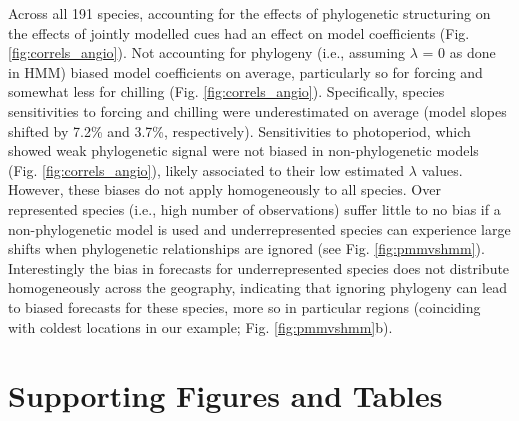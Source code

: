 \documentclass[11pt]{article}
\begin{document}
Across all 191 species, accounting for the effects of phylogenetic structuring on the effects of jointly modelled cues had an effect on model coefficients (Fig. \ref{fig:correls_angio}). Not accounting for phylogeny (i.e., assuming $\lambda$ = 0 as done in HMM) biased model coefficients on average, particularly so for forcing and somewhat less for chilling (Fig. \ref{fig:correls_angio}). Specifically, species sensitivities to forcing and chilling were underestimated on average (model slopes shifted by 7.2\% and 3.7\%, respectively). Sensitivities to photoperiod, which showed weak phylogenetic signal were not biased in non-phylogenetic models (Fig. \ref{fig:correls_angio}), likely associated to their low estimated $\lambda$ values. However, these biases do not apply homogeneously to all species. Over represented species (i.e., high number of observations) suffer little to no bias if a non-phylogenetic model is used and underrepresented species can experience large shifts when phylogenetic relationships are ignored (see Fig. \ref{fig:pmmvshmm}). Interestingly the bias in forecasts for underrepresented species does not distribute homogeneously across the geography, indicating that ignoring phylogeny can lead to biased forecasts for these species, more so in particular regions (coinciding with coldest locations in our example; Fig. \ref{fig:pmmvshmm}b).\\ 

\clearpage







\clearpage
\section*{Supporting Figures and Tables}
\end{document}
